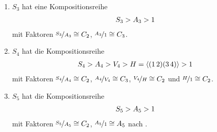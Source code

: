 \begin{example}
	\begin{enumerate}[label=(\alph*)]
		\item $S_3$ hat eine Kompositionsreihe
		\begin{align}
			S_3 > A_3 > 1 \notag %
		\end{align}
		mit Faktoren $\nicefrac{S_3}{A_3} \cong C_2$, $\nicefrac{A_3}{1} \cong C_3$.
		\item $S_4$ hat die Kompositionsreihe
		\begin{align}
			S_4 > A_4 > V_4 > H=\langle (1\, 2)(3\, 4)\rangle > 1 \notag %
		\end{align}
		mit Faktoren $\nicefrac{S_4}{A_4} \cong C_2$, $\nicefrac{A_4}{V_4} \cong C_3$, $\nicefrac{V_4}{H} \cong C_2$ und $\nicefrac{H}{1}\cong C_2$.
		\item $S_5$ hat die Kompositionsreihe
		\begin{align}
			S_5 > A_5 > 1\notag %
		\end{align}
		mit Faktoren $\nicefrac{S_5}{A_5} \cong C_2$, $\nicefrac{A_5}{1} \cong A_5$ nach .
	\end{enumerate}
\end{example}


